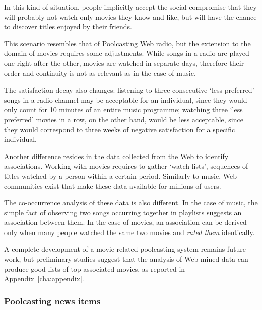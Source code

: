 In this kind of situation, people implicitly accept the social compromise that they will probably not watch only movies they know and like, but will have the chance to discover titles enjoyed by their friends.

This scenario resembles that of Poolcasting Web radio, but the extension to the domain of movies requires some adjustments.
While songs in a radio are played one right after the other, movies are watched in separate days, therefore their order and continuity is not as relevant as in the case of music.

The satisfaction decay also changes: listening to three consecutive `less preferred' songs in a radio channel may be acceptable for an individual, since they would only count for 10 minutes of an entire music programme; watching three `less preferred' movies in a row, on the other hand, would be less acceptable, since they would correspond to three weeks of negative satisfaction for a specific individual.

Another difference resides in the data collected from the Web to identify associations. Working with movies requires to gather `watch-lists', sequences of titles watched by a person within a certain period.
Similarly to music, Web communities exist that make these data available for millions of users.

The co-occurrence analysis of these data is also different.
In the case of music, the simple fact of observing two songs occurring together in playlists suggests an association between them.
In the case of movies, an association can be derived only when many people watched the same two movies and \emph{rated them} identically.

A complete development of a movie-related poolcasting system remains future work, but preliminary studies suggest that the analysis of Web-mined data can produce good lists of top associated movies, as reported in Appendix~\ref{cha:appendix}.


\subsubsection{Poolcasting news items} %

